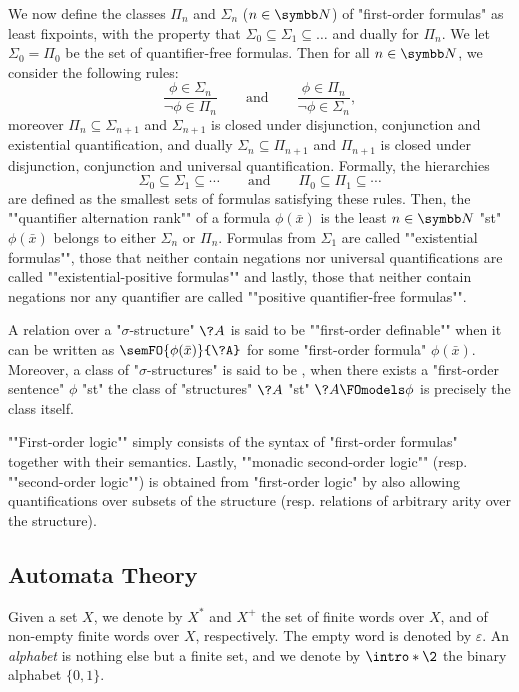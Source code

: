 We now define the classes $\Pi_n$ and $\Sigma_n$ ($n\in\N$) of "first-order formulas"
as least fixpoints, with the property that $\Sigma_0 \subseteq \Sigma_1 \subseteq \dotsc$ and dually for $\Pi_n$.
We let $\Sigma_0 = \Pi_0$ be the set of quantifier-free formulas.
Then for all $n\in\N$, we consider the following rules:
\[
	\frac{
		\phi \in \Sigma_n
	}{
		\neg \phi \in \Pi_n
	} \qquad\text{and}\qquad
	\frac{
		\phi \in \Pi_n
	}{
		\neg \phi \in \Sigma_n
	},
\]
moreover $\Pi_n \subseteq \Sigma_{n+1}$ and $\Sigma_{n+1}$ is closed under
disjunction, conjunction and existential quantification,
and dually $\Sigma_n \subseteq \Pi_{n+1}$ and $\Pi_{n+1}$ is closed under
disjunction, conjunction and universal quantification.
Formally, the hierarchies
\[
	\Sigma_0 \subseteq \Sigma_1 \subseteq \cdots
	\qquad\text{and}\qquad
	\Pi_0 \subseteq \Pi_1 \subseteq \cdots
\]
are defined as the smallest sets of formulas satisfying these rules.
Then, the \AP""quantifier alternation rank"" of a formula $\phi(\bar x)$
is the least $n\in\N$ "st" $\phi(\bar x)$ belongs to either
$\Sigma_n$ or $\Pi_n$.
Formulas from $\Sigma_1$ are called ""existential formulas"",
those that neither contain negations nor universal quantifications are called \AP""existential-positive formulas"" and lastly, those that neither contain negations
nor any quantifier
are called ""positive quantifier-free formulas"".

A relation over a "$\sigma$-structure" $\?A$ is said to be
\AP""first-order definable"" when it can be written as
$\semFO{\phi(\bar x)}{\?A}$ for some "first-order formula" $\phi(\bar x)$.
Moreover, a class of "$\sigma$-structures" is said to be ,
when there exists a "first-order sentence" $\phi$ "st" the class of "structures" $\?A$
"st" $\?A \FOmodels \phi$ is precisely the class itself.

\AP""First-order logic"" simply consists of the syntax of "first-order formulas" together
with their semantics. Lastly, \AP""monadic second-order logic""
(resp. ""second-order logic"") is obtained from "first-order logic"
by also allowing quantifications over subsets of the structure
(resp. relations of arbitrary arity over the structure).

\subsection{Automata Theory}

Given a set $X$, we denote by $X^*$ and $X^+$ the set of finite words
over $X$, and of non-empty finite words over $X$, respectively.
The empty word is denoted by $\varepsilon$.
An \emph{alphabet} is nothing else but a finite set, and we denote by
$\intro*\2$ the binary alphabet $\{0,1\}$.

